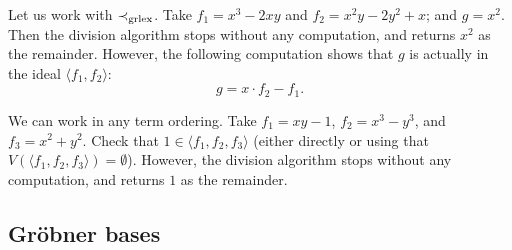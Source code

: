 \documentclass[11pt]{article}
\begin{document}
\begin{example}
  Let us work with $\prec_{\rm grlex}$.
  Take $f_1  = x^3-2xy$ and $f_2 = x^2y-2y^2+x$; and $g = x^2$.
  Then the division algorithm stops without any computation, and returns $x^2$ as the remainder.
  However, the following computation shows that $g$ is actually in the ideal $\langle  f_1, f_2 \rangle$:
  \[ g = x \cdot f_2 - f_1.\]
\end{example}

\begin{example}
  We can work in any term ordering.
  Take $f_1 = xy-1$, $f_2 = x^3-y^3$, and $f_3 = x^2+y^2$.
  Check that $1 \in \langle  f_1, f_2, f_3 \rangle$ (either directly or using that $V(\langle  f_1, f_2, f_3 \rangle) = \emptyset$).
  However, the division algorithm stops without any computation, and returns $1$ as the remainder.
\end{example}

\subsection{Gr\"obner bases}



\end{document}

